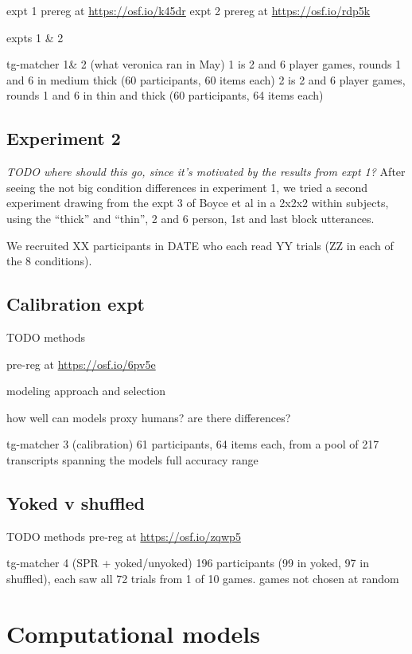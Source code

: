 \documentclass[10pt, letterpaper]{article}
\begin{document}
expt 1 prereg at \url{https://osf.io/k45dr} expt 2 prereg at
\url{https://osf.io/rdp5k}

expts 1 \& 2

tg-matcher 1\& 2 (what veronica ran in May) 1 is 2 and 6 player games,
rounds 1 and 6 in medium thick (60 participants, 60 items each) 2 is 2
and 6 player games, rounds 1 and 6 in thin and thick (60 participants,
64 items each)

\subsection{Experiment 2}\label{experiment-2}

\emph{TODO where should this go, since it's motivated by the results
from expt 1?} After seeing the not big condition differences in
experiment 1, we tried a second experiment drawing from the expt 3 of
Boyce et al in a 2x2x2 within subjects, using the ``thick'' and
``thin'', 2 and 6 person, 1st and last block utterances.

We recruited XX participants in DATE who each read YY trials (ZZ in each
of the 8 conditions).

\subsection{Calibration expt}\label{calibration-expt}

TODO methods

pre-reg at \url{https://osf.io/6pv5e}

modeling approach and selection

how well can models proxy humans? are there differences?

tg-matcher 3 (calibration) 61 participants, 64 items each, from a pool
of 217 transcripts spanning the models full accuracy range

\subsection{Yoked v shuffled}\label{yoked-v-shuffled}

TODO methods pre-reg at \url{https://osf.io/zqwp5}

tg-matcher 4 (SPR + yoked/unyoked) 196 participants (99 in yoked, 97 in
shuffled), each saw all 72 trials from 1 of 10 games. games not chosen
at random

\section{Computational models}\label{computational-models}
\end{document}
